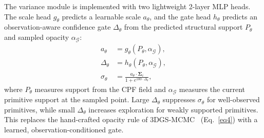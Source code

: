 \documentclass[lettersize,journal]{IEEEtran}
\begin{document}
The variance module is implemented with two lightweight 2-layer MLP heads. The scale head $g_{\theta}$ predicts a learnable scale $a_{\theta}$, and the gate head $h_{\theta}$ predicts an observation-aware confidence gate $\Delta_{\theta}$ from the predicted structural support $P_{\theta}$ and sampled opacity $\alpha_{\mathcal{G}}$:
\begin{align}
    a_{\theta} &= g_{\theta}\left(P_{\theta}, \alpha_{\mathcal{G}}\right), \\
    \Delta_{\theta} &= h_{\theta}\left(P_{\theta}, \alpha_{\mathcal{G}}\right), \\
    \sigma_{\theta} &= \frac{a_{\theta} \cdot \mathbf{\Sigma}_i}{1 + e^{100 \cdot \Delta_{\theta}}}, 
    \label{eq25}
\end{align}
where $P_{\theta}$ measures support from the CPF field and $\alpha_{\mathcal{G}}$ measures the current primitive support at the sampled point.
Large $\Delta_{\theta}$ suppresses $\sigma_{\theta}$ for well-observed primitives, while small $\Delta_{\theta}$ increases exploration for weakly supported primitives. This replaces the hand-crafted opacity rule of 3DGS-MCMC~\cite{mcmc} (Eq.~\ref{eq4}) with a learned, observation-conditioned gate.
\end{document}
